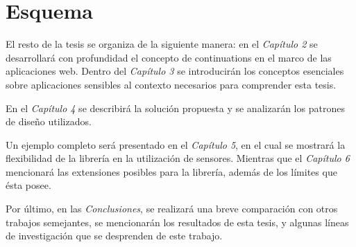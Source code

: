 \section{Esquema}

El resto de la tesis se organiza de la siguiente manera: en el \emph{Capítulo 2} se desarrollará con profundidad el concepto de continuations en el marco de las aplicaciones web. Dentro del \emph{Capítulo 3} se introducirán los conceptos esenciales sobre aplicaciones sensibles al contexto necesarios para comprender esta tesis.

En el \emph{Capítulo 4} se describirá la solución propuesta y se analizarán los patrones de diseño utilizados.

Un ejemplo completo será presentado en el \emph{Capítulo 5}, en el cual se mostrará la flexibi\-lidad de la librería en la utilización de sensores. Mientras que el \emph{Capítulo 6} mencionará las extensiones posibles para la librería, además de los límites que ésta posee.

Por último, en las \emph{Conclusiones}, se realizará una breve comparación con otros trabajos semejantes, se mencionarán los resultados de esta tesis, y algunas líneas de investigación que se desprenden de este trabajo.